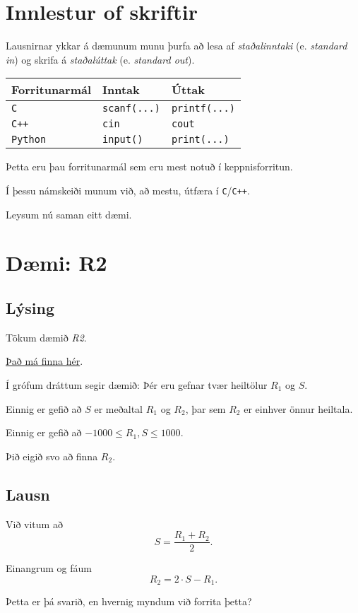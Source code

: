 \section{Innlestur of skriftir}
{
    {
        \item<1-> Lausnirnar ykkar á dæmunum munu þurfa að lesa af \emph{staðalinntaki} (e. \emph{standard in})
            og skrifa á \emph{staðalúttak} (e. \emph{standard out}).
        \item<2->[]
        \begin{tabular}{l l l}
            Forritunarmál & Inntak & Úttak\\
            \hline
            \texttt{C} & \texttt{scanf(...)} & \texttt{printf(...)}\\
            \texttt{C++} & \texttt{cin} & \texttt{cout}\\
            \texttt{Python} & \texttt{input()} & \texttt{print(...)}
        \end{tabular}

        \item<3-> Þetta eru þau forritunarmál sem eru mest notuð í keppnisforritun.
        \item<4-> Í þessu námskeiði munum við, að mestu, útfæra í \texttt{C}/\texttt{C++}.
        \item<5-> Leysum nú saman eitt dæmi.
    }
}

\section{Dæmi: R2}
\subsection{Lýsing}
{
    {
        \item<1-> Tökum dæmið \emph{R2}.
        \item<2-> {\color{blue} \href{https://hi.kattis.com/problems/r2}{Það má finna hér}}.
        \item<3-> Í grófum dráttum segir dæmið: Þér eru gefnar tvær heiltölur $R_1$ og $S$.
        \item<4-> Einnig er gefið að $S$ er meðaltal $R_1$ og $R_2$, þar sem $R_2$ er einhver önnur heiltala.
        \item<5-> Einnig er gefið að $-1000 \leq R_1, S \leq 1000$.
        \item<6-> Þið eigið svo að finna $R_2$.
    }
}

\subsection{Lausn}
{
    {
        \item<1-> Við vitum að
        \[
            S = \frac{R_1 + R_2}{2}.
        \]
        \item<2-> Einangrum og fáum
        \[
            R_2 = 2 \cdot S - R_1.
        \]
        \item<3-> Þetta er þá svarið, en hvernig myndum við forrita þetta?
    }
}

